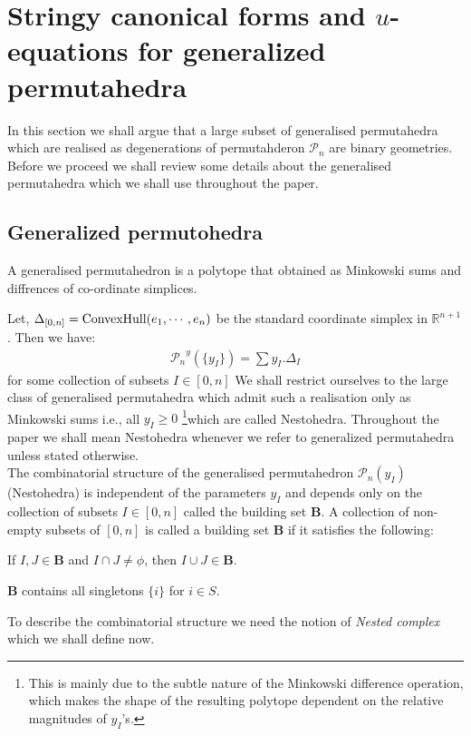 \documentclass[hidelinks,12pt]{article}
\newcommand{\bea}[1]{\begin{eqnarray}\label{#1} }
\newcommand{\eea}{\end{eqnarray}}
\def\bea{\begin{eqnarray}}
\def\eea{\end{eqnarray}}
\begin{document}
\section{Stringy canonical forms and $u$-equations for generalized permutahedra}
In this section we shall argue that  a large subset of generalised permutahedra which are realised as degenerations of permutahderon ${\mathscr P_n}$ are binary geometries. Before we proceed we shall review some details about the generalised permutahedra which we shall use throughout the paper.
\subsection{Generalized permutohedra} 
A generalised permutahedron is a polytope that obtained as Minkowski sums and diffrences of co-ordinate simplices. 

Let, $\Delta_{[0,n]} = {\rm ConvexHull}(e_1,\cdots,e_n)$ be the standard coordinate simplex in $\mathbb{R}^{n+1}$. Then we have:
  \bea
{\mathscr P_n}^y(\{y_I \})= \sum y_I . \Delta_I  
 \eea
 for some collection of subsets $I \in [0,n]$
 We shall restrict ourselves to the large class of generalised permutahedra which admit such a realisation only as Minkowski sums i.e., all $y_I \ge 0$ \footnote{This is mainly due to the subtle nature of the Minkowski difference operation, which makes the shape of the resulting polytope dependent on the relative magnitudes of $y_I$'s.}which are called Nestohedra. Throughout the paper we shall mean Nestohedra whenever we refer to generalized permutahedra unless stated otherwise.\\
 
 The combinatorial structure of the generalised permutahedron ${\mathscr P_n({y_I})}$ (Nestohedra) is independent of the parameters $y_I$ and depends only on the collection of subsets $I \in [0,n]$ called the  building set ${\mathbf B}$.  
A collection of non-empty subsets of $[0,n]$ is called a building set ${\mathbf B}$ if it satisfies the following:
\begin{compactenum}[\quad (1)]
    \item If $I,J \in {\mathbf B}$ and $I \cap J \neq \phi $, then $I \cup J \in {\mathbf B}$.
    \item ${\mathbf B}$ contains all singletons $\{ i\}$ for $i \in S$.
\end{compactenum}
To describe the combinatorial structure we need the notion of {\it Nested complex} which we shall define now.
\end{document}
